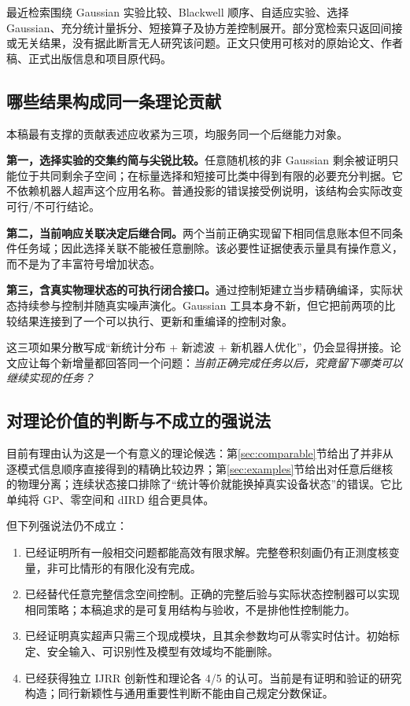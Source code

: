 \documentclass[UTF8,fontset=fandol,11pt,a4paper]{ctexart}
\theoremstyle{definition}\newtheorem{definition}[theorem]{定义}\newtheorem{assumption}[theorem]{条件}
\numberwithin{equation}{section}
\begin{document}
最近检索围绕 Gaussian 实验比较、Blackwell 顺序、自适应实验、选择 Gaussian、充分统计量拆分、短接算子及协方差控制展开。部分宽检索只返回间接或无关结果，没有据此断言无人研究该问题。正文只使用可核对的原始论文、作者稿、正式出版信息和项目原代码。

\subsection{哪些结果构成同一条理论贡献}
本稿最有支撑的贡献表述应收紧为三项，均服务同一个后继能力对象。

\textbf{第一，选择实验的交集约简与尖锐比较。}任意随机核的非 Gaussian 剩余被证明只能位于共同剩余子空间；在标量选择和短接可比类中得到有限的必要充分判据。它不依赖机器人超声这个应用名称。普通投影的错误接受例说明，该结构会实际改变可行/不可行结论。

\textbf{第二，当前响应关联决定后继合同。}两个当前正确实现留下相同信息账本但不同条件任务域；因此选择关联不能被任意删除。该必要性证据使表示量具有操作意义，而不是为了丰富符号增加状态。

\textbf{第三，含真实物理状态的可执行闭合接口。}通过控制矩建立当步精确编译，实际状态持续参与控制并随真实噪声演化。Gaussian 工具本身不新，但它把前两项的比较结果连接到了一个可以执行、更新和重编译的控制对象。

这三项如果分散写成“新统计分布 + 新滤波 + 新机器人优化”，仍会显得拼接。论文应让每个新增量都回答同一个问题：\emph{当前正确完成任务以后，究竟留下哪类可以继续实现的任务？}

\subsection{对理论价值的判断与不成立的强说法}
目前有理由认为这是一个有意义的理论候选：第\ref{sec:comparable}节给出了并非从逐模式信息顺序直接得到的精确比较边界；第\ref{sec:examples}节给出对任意后继核的物理分离；连续状态接口排除了“统计等价就能换掉真实设备状态”的错误。它比单纯将 GP、零空间和 dIRD 组合更具体。

但下列强说法仍不成立：
\begin{enumerate}
\item 已经证明所有一般相交问题都能高效有限求解。完整卷积刻画仍有正测度核变量，非可比情形的有限化没有完成。
\item 已经替代任意完整信念空间控制。正确的完整后验与实际状态控制器可以实现相同策略；本稿追求的是可复用结构与验收，不是排他性控制能力。
\item 已经证明真实超声只需三个现成模块，且其余参数均可从零实时估计。初始标定、安全输入、可识别性及模型有效域均不能删除。
\item 已经获得独立 IJRR 创新性和理论各 4/5 的认可。当前是有证明和验证的研究构造；同行新颖性与通用重要性判断不能由自己规定分数保证。
\end{enumerate}
\end{document}
